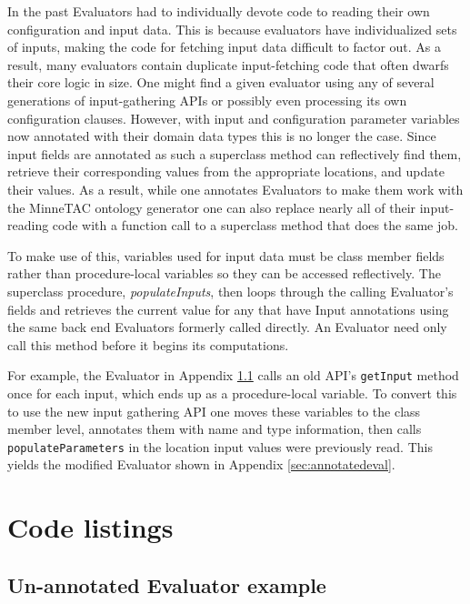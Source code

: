 \documentclass{article}
\begin{document}
In the past Evaluators had to individually devote code to reading their own configuration and input data.
This is because evaluators have individualized sets of inputs, making the code for fetching input data difficult to factor out.
As a result, many evaluators contain duplicate input-fetching code that often dwarfs their core logic in size.
One might find a given evaluator using any of several generations of input-gathering APIs or possibly even processing its own configuration clauses.
However, with input and configuration parameter variables now annotated with their domain data types this is no longer the case.
Since input fields are annotated as such a superclass method can reflectively find them, retrieve their corresponding values from the appropriate locations, and update their values.
As a result, while one annotates Evaluators to make them work with the MinneTAC ontology generator one can also replace nearly all of their input-reading code with a function call to a superclass method that does the same job.

To make use of this, variables used for input data must be class member fields rather than procedure-local variables so they can be accessed reflectively.
The superclass procedure, \emph{populateInputs}, then loops through the calling Evaluator's fields and retrieves the current value for any that have Input annotations using the same back end Evaluators formerly called directly.
An Evaluator need only call this method before it begins its computations.

For example, the Evaluator in Appendix \ref{sec:unannotatedeval} calls an old API's \texttt{getInput} method once for each input, which ends up as a procedure-local variable.
To convert this to use the new input gathering API one moves these variables to the class member level, annotates them with name and type information, then calls \texttt{populateParameters} in the location input values were previously read.  This yields the modified Evaluator shown in Appendix \ref{sec:annotatedeval}.

\clearpage
\appendix

\section{Code listings}

\subsection{Un-annotated Evaluator example}
\label{sec:unannotatedeval}
\end{document}
